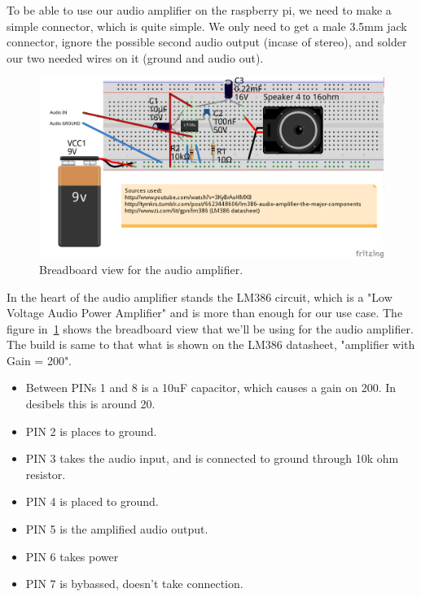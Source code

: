 \documentclass[english,11pt,twoside,a4paper]{article}
\begin{document}
To be able to use our audio amplifier on the raspberry pi, we need to make a simple connector, which is quite simple. We only need to get a male 3.5mm jack connector, ignore the possible second audio output (incase of stereo), and solder our two needed wires on it (ground and audio out).

\begin{figure}
  \begin{center}
    \includegraphics[scale=0.75]{audio_amplifier_lm386_bb.png}
    \caption{Breadboard view for the audio amplifier.}
  \end{center}
  \label{lm386_bb}
\end{figure}

In the heart of the audio amplifier stands the LM386 circuit, which is a "Low Voltage Audio Power Amplifier" and is more than enough for our use case. The figure in~\ref{lm386_bb} shows the breadboard view that we'll be using for the audio amplifier. The build is same to that what is shown on the LM386 datasheet, "amplifier with Gain = 200".

\begin{itemize}
  \item Between PINs 1 and 8 is a 10uF capacitor, which causes a gain on 200. In desibels this is around 20. 
  \item PIN 2 is places to ground.
  \item PIN 3 takes the audio input, and is connected to ground through 10k ohm resistor.
  \item PIN 4 is placed to ground.
  \item PIN 5 is the amplified audio output.
  \item PIN 6 takes power
  \item PIN 7 is bybassed, doesn't take connection.
\end{itemize}
\end{document}
